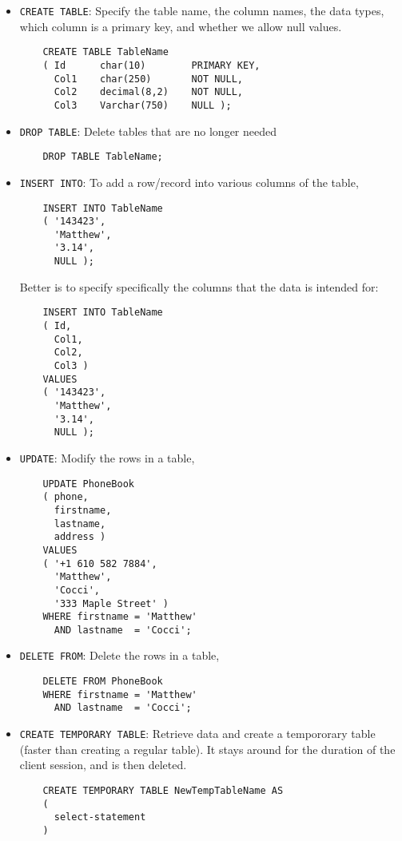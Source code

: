 \documentclass[12pt]{article}
\theoremstyle{plain}
\theoremstyle{definition}
\theoremstyle{remark}
\begin{document}
\begin{itemize}
  \item
    \texttt{CREATE TABLE}:
    Specify the table name, the column names,
    the data types, which column is a primary key, and
    whether we allow null values.
    \begin{lstlisting}
    CREATE TABLE TableName
    ( Id      char(10)        PRIMARY KEY,
      Col1    char(250)       NOT NULL,
      Col2    decimal(8,2)    NOT NULL,
      Col3    Varchar(750)    NULL );
    \end{lstlisting}

  \item \texttt{DROP TABLE}:
    Delete tables that are no longer needed
    \begin{lstlisting}
    DROP TABLE TableName;
    \end{lstlisting}


  \item
    \texttt{INSERT INTO}:
    To add a row/record into various columns of the table,
    \begin{lstlisting}
    INSERT INTO TableName
    ( '143423',
      'Matthew',
      '3.14',
      NULL );
    \end{lstlisting}
    Better is to specify specifically the columns that the data is
    intended for:
    \begin{lstlisting}
    INSERT INTO TableName
    ( Id,
      Col1,
      Col2,
      Col3 )
    VALUES
    ( '143423',
      'Matthew',
      '3.14',
      NULL );
    \end{lstlisting}

  \item
    \texttt{UPDATE}:
    Modify the rows in a table,
    \begin{lstlisting}
    UPDATE PhoneBook
    ( phone,
      firstname,
      lastname,
      address )
    VALUES
    ( '+1 610 582 7884',
      'Matthew',
      'Cocci',
      '333 Maple Street' )
    WHERE firstname = 'Matthew'
      AND lastname  = 'Cocci';
    \end{lstlisting}

  \item \texttt{DELETE FROM}:
    Delete the rows in a table,
    \begin{lstlisting}
    DELETE FROM PhoneBook
    WHERE firstname = 'Matthew'
      AND lastname  = 'Cocci';
    \end{lstlisting}

  \item
    \texttt{CREATE TEMPORARY TABLE}:
    Retrieve data and create a tempororary table (faster than creating a
    regular table). It stays around for the duration of the client
    session, and is then deleted.
    \begin{lstlisting}
    CREATE TEMPORARY TABLE NewTempTableName AS
    (
      select-statement
    )
    \end{lstlisting}


\end{itemize}
\end{document}
